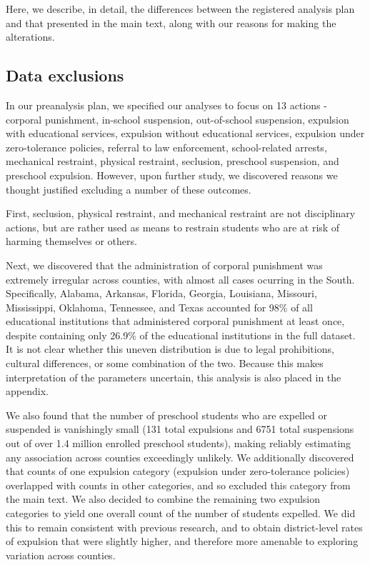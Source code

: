 \documentclass[]{article}
\theoremstyle{definition}
\theoremstyle{definition}
\theoremstyle{remark}
\begin{document}
Here, we describe, in detail, the differences between the registered
analysis plan and that presented in the main text, along with our
reasons for making the alterations.

\subsection{Data exclusions}\label{data-exclusions}

In our preanalysis plan, we specified our analyses to focus on 13
actions - corporal punishment, in-school suspension, out-of-school
suspension, expulsion with educational services, expulsion without
educational services, expulsion under zero-tolerance policies, referral
to law enforcement, school-related arrests, mechanical restraint,
physical restraint, seclusion, preschool suspension, and preschool
expulsion. However, upon further study, we discovered reasons we thought
justified excluding a number of these outcomes.

First, seclusion, physical restraint, and mechanical restraint are not
disciplinary actions, but are rather used as means to restrain students
who are at risk of harming themselves or others.

Next, we discovered that the administration of corporal punishment was
extremely irregular across counties, with almost all cases ocurring in
the South. Specifically, Alabama, Arkansas, Florida, Georgia, Louisiana,
Missouri, Mississippi, Oklahoma, Tennessee, and Texas accounted for 98\%
of all educational institutions that administered corporal punishment at
least once, despite containing only 26.9\% of the educational
institutions in the full dataset. It is not clear whether this uneven
distribution is due to legal prohibitions, cultural differences, or some
combination of the two. Because this makes interpretation of the
parameters uncertain, this analysis is also placed in the appendix.

We also found that the number of preschool students who are expelled or
suspended is vanishingly small (131 total expulsions and 6751 total
suspensions out of over 1.4 million enrolled preschool students), making
reliably estimating any association across counties exceedingly
unlikely. We additionally discovered that counts of one expulsion
category (expulsion under zero-tolerance policies) overlapped with
counts in other categories, and so excluded this category from the main
text. We also decided to combine the remaining two expulsion categories
to yield one overall count of the number of students expelled. We did
this to remain consistent with previous research, and to obtain
district-level rates of expulsion that were slightly higher, and
therefore more amenable to exploring variation across counties.
\end{document}

